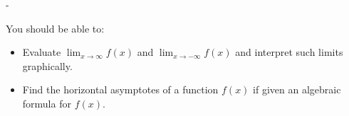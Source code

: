 \documentclass{article}
\makeatletter
\newlength{\tipmargin}
\renewenvironment{framed}{
  \setlength{\tipmargin}{\textwidth-\linewidth}
  \advance\@totalleftmargin-\tipmargin
  \def\FrameCommand{\hspace{\tipmargin}\fbox}%
  \advance\linewidth\tipmargin
  \MakeFramed {\advance\hsize-\width \FrameRestore}%
}
{\endMakeFramed}
\makeatother
\begin{document}

\begin{problemonly}
  \begin{framed}

You should be able to:
    \begin{itemize}[topsep=0pt,partopsep=0pt,parsep=8pt,itemsep=0pt]
    \item Evaluate $\displaystyle \lim_{x \to \infty} f(x)$ and $\displaystyle \lim_{x \to -\infty} f(x)$ and interpret such limits graphically.

    \item Find the horizontal asymptotes of a function $f(x)$ if given an algebraic formula for $f(x)$. 
    \end{itemize}
  \end{framed}
\end{problemonly}
\end{document}
